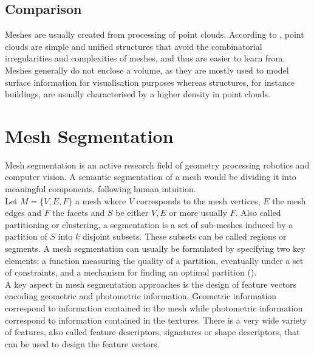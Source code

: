 \documentclass{kththesis}
\begin{document}
\subsection{Comparison}
Meshes are usually created from processing of point clouds. According to \parencite{class3D},  point clouds are simple and unified structures that avoid the
combinatorial irregularities and complexities of meshes, and thus are easier to learn from. \\
Meshes generally do not enclose a volume, as they are mostly used to model surface information  for visualisation purposes whereas structures, for instance buildings, are usually characterised by a higher density in point clouds. 
\section{Mesh Segmentation}
Mesh segmentation is an active research field of geometry processing robotics and computer vision. A semantic segmentation of a mesh would be dividing it into meaningful components, following human intuition.\\

Let $M=\{V, E, F\}$ a mesh where $V$ corresponds to the mesh vertices, $E$ the mesh edges and $F$ the facets and $S$ be either $V, E$ or more usually $F$. Also called partitioning or clustering, a segmentation is a set of sub-meshes induced by a partition of $S$ into $k$ disjoint subsets. These subsets can be called regions or segments.
A mesh segmentation can usually be formulated by specifying two key elements: a function measuring the quality of a partition, eventually under a set of constraints, and a mechanism for finding an optimal partition (\textcite{MeshSegCourse}).\\



\noindent A key aspect in mesh segmentation approaches is the design of feature vectors encoding geometric and photometric information. Geometric information correspond to information contained in the mesh while photometric information correspond to information contained in the textures. There is a very wide variety of features, also called feature descriptors, signatures or shape descriptors, that can be used to design the feature vectors. 
\end{document}
